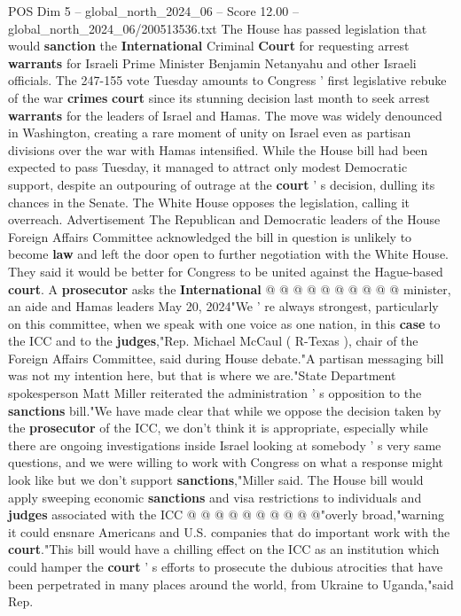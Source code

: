 \begin{textsample}{POS Dim 5 – global\_north\_2024\_06 – Score 12.00 – global\_north\_2024\_06/200513536.txt}  \label{ex:f5_pos_379}
The House has passed legislation that would \textbf{sanction} the \textbf{International} Criminal \textbf{Court} for requesting arrest \textbf{warrants} for Israeli Prime Minister Benjamin Netanyahu and other Israeli officials.
The 247-155 vote Tuesday amounts to Congress ' first legislative rebuke of the war \textbf{crimes} \textbf{court} since its stunning decision last month to seek arrest \textbf{warrants} for the leaders of Israel and Hamas.
The move was widely denounced in Washington, creating a rare moment of unity on Israel even as partisan divisions over the war with Hamas intensified.
While the House bill had been expected to pass Tuesday, it managed to attract only modest Democratic support, despite an outpouring of outrage at the \textbf{court} ' s decision, dulling its chances in the Senate.
The White House opposes the legislation, calling it overreach.
Advertisement The Republican and Democratic leaders of the House Foreign Affairs Committee acknowledged the bill in question is unlikely to become \textbf{law} and left the door open to further negotiation with the White House.
They said it would be better for Congress to be united against the Hague-based \textbf{court}.
A \textbf{prosecutor} asks the \textbf{International} @ @ @ @ @ @ @ @ @ @ minister, an aide and Hamas leaders May 20, 2024"We ' re always strongest, particularly on this committee, when we speak with one voice as one nation, in this \textbf{case} to the ICC and to the \textbf{judges},"Rep.
Michael McCaul ( R-Texas ), chair of the Foreign Affairs Committee, said during House debate."A partisan messaging bill was not my intention here, but that is where we are."State Department spokesperson Matt Miller reiterated the administration ' s opposition to the \textbf{sanctions} bill."We have made clear that while we oppose the decision taken by the \textbf{prosecutor} of the ICC, we don't think it is appropriate, especially while there are ongoing investigations inside Israel looking at somebody ' s very same questions, and we were willing to work with Congress on what a response might look like but we don't support \textbf{sanctions},"Miller said.
The House bill would apply sweeping economic \textbf{sanctions} and visa restrictions to individuals and \textbf{judges} associated with the ICC @ @ @ @ @ @ @ @ @ @"overly broad,"warning it could ensnare Americans and U.S. companies that do important work with the \textbf{court}."This bill would have a chilling effect on the ICC as an institution which could hamper the \textbf{court} ' s efforts to prosecute the dubious atrocities that have been perpetrated in many places around the world, from Ukraine to Uganda,"said Rep.

\end{textsample}
